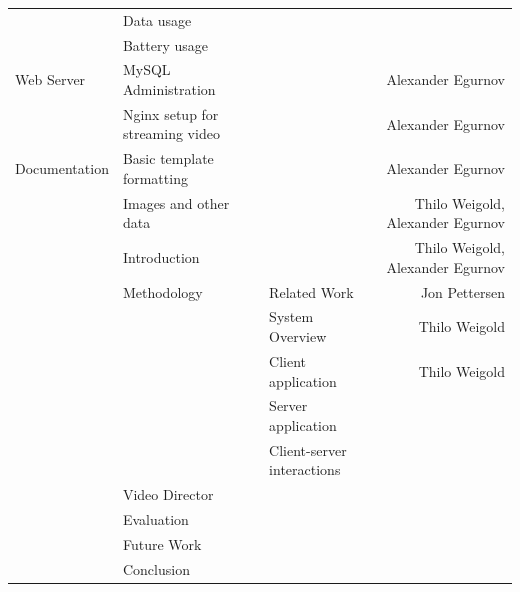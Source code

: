 \documentclass[conference]{IEEEtran}
\begin{document}
\begin{table}[t]
\begin{tabular}{lllr}
			& Data usage & & \\
			& Battery usage & & \\
		\midrule
		Web Server
			& MySQL Administration & & Alexander Egurnov \\
			& Nginx setup for streaming video & & Alexander Egurnov \\
		\midrule
		Documentation 
			& Basic template formatting & & Alexander Egurnov \\
			& Images and other data & & Thilo Weigold, Alexander Egurnov \\
			& Introduction & & Thilo Weigold, Alexander Egurnov \\
			& Methodology & Related Work & Jon Pettersen \\
			&       & System Overview & Thilo Weigold \\
			&		& Client application & Thilo Weigold \\
			&		& Server application & \\
			&		& Client-server interactions & \\
			& Video Director & & \\
			& Evaluation & & \\
			& Future Work & & \\
			& Conclusion & & \\
		\bottomrule
    \end{tabular}%
\end{table}%

\vfill
\end{document}
